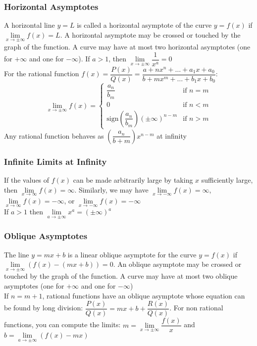 \documentclass{article}
\begin{document}
	\subsubsection{Horizontal Asymptotes}
	A horizontal line $y=L$ is called a horizontal asymptote of the curve $y=f(x)$ if $\lim\limits_{x\to\pm\infty}f(x)=L$. A horizontal asymptote may be crossed or touched by the graph of the function. A curve may have at most two horizontal asymptotes (one for $+\infty$ and one for $-\infty$). If $a>1$, then $\lim\limits_{x\to\pm\infty}\dfrac{1}{x^a}=0$\\
	For the rational function $f(x)=\dfrac{P(x)}{Q(x)}=\dfrac{a+nx^n+\dots+a_1x+a_0}{b+mx^m+\dots+b_1x+b_0}$:
	\[\lim_{x\to\pm\infty}f(x)=\begin{cases}
		\dfrac{a_n}{b_m}&\text{if }n=m\\
		0&\text{if }n<m\\
		\text{sign}\left(\dfrac{a_n}{b_m}\right)(\pm\infty)^{n-m}&\text{if }n>m
	\end{cases}\]
	Any rational function behaves as $\left(\dfrac{a_n}{b+m}\right)x^{n-m}$ at infinity
	\subsubsection{Infinite Limits at Infinity}
	If the values of $f(x)$ can be made arbitrarily large by taking $x$ sufficiently large, then $\lim\limits_{x\to\infty}f(x)=\infty$. Similarly, we may have $\lim\limits_{x\to-\infty}f(x)=\infty$, $\lim\limits_{x\to\infty}f(x)=-\infty$, or $\lim\limits_{x\to-\infty}f(x)=-\infty$\\
	If $a>1$ then $\lim\limits_{a\to\pm\infty}x^a=(\pm\infty)^a$
	\subsubsection{Oblique Asymptotes}
	The line $y=mx+b$ is a linear oblique asymptote for the curve $y=f(x)$ if $\lim\limits_{x\to\pm\infty}\left(f(x)-(mx+b)\right)=0$. An oblique asymptote may be crossed or touched by the graph of the function. A curve may have at most two oblique asymptotes (one for $+\infty$ and one for $-\infty$)\\
	If $n=m+1$, rational functions have an oblique asymptote whose equation can be found by long division: $\dfrac{P(x)}{Q(x)}=mx+b+\dfrac{R(x)}{Q(x)}$. For non rational functions, you can compute the limits: $m=\lim\limits_{x\to\pm\infty}\dfrac{f(x)}{x}$ and $b=\lim\limits_{a\to\pm\infty}(f(x)-mx)$
	\setcounter{section}{5}
	\setcounter{subsection}{2}
\end{document}
